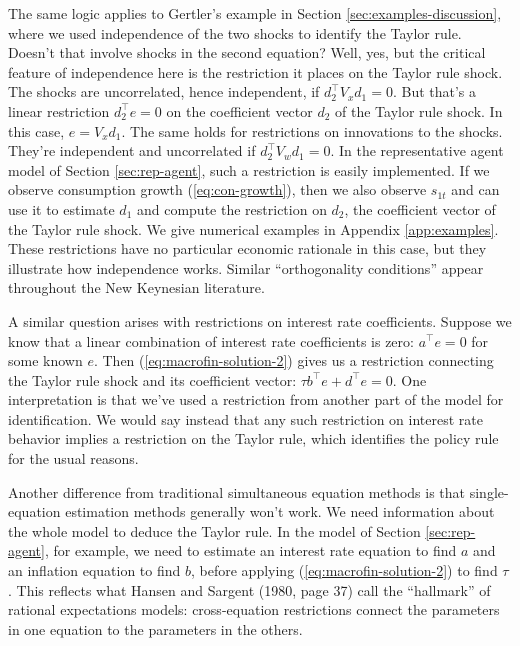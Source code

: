 \documentclass[11pt]{article}
\begin{document}
{The same logic applies to Gertler's example in Section \ref{sec:examples-discussion},
where we used independence of the two shocks to identify the Taylor rule.
Doesn't that involve shocks in the second equation?
Well, yes, but the critical feature of independence here
is the restriction it places on the Taylor rule shock.
The shocks are uncorrelated, hence independent, if $d_2^\top V_x d_1 = 0$.
But that's a linear restriction $d_2^\top e = 0$ on the coefficient vector $d_2$ of the Taylor rule shock.  In this case, $e = V_x d_1$.
The same holds for restrictions on innovations to the shocks.
They're independent and uncorrelated if $d_2^\top V_w d_1 = 0$.
In the representative agent model of Section \ref{sec:rep-agent},
such a restriction is easily implemented.
If we observe consumption growth (\ref{eq:con-growth}),
then we also observe $s_{1t}$ and can use it to estimate $d_1$
and compute the restriction on $d_2$,
the coefficient vector of the Taylor rule shock.
We give numerical examples in Appendix \ref{app:examples}.
These restrictions have no particular economic rationale in this case,
but they illustrate how independence works.
Similar ``orthogonality conditions'' appear throughout the New Keynesian literature.

A similar question arises with restrictions on interest rate coefficients.
Suppose we know that a linear combination of interest rate coefficients is zero:
 $a^\top e = 0$ for some known $e$.
Then (\ref{eq:macrofin-solution-2}) gives us a restriction connecting
the Taylor rule shock and its coefficient vector:
$ \tau b^\top e + d^\top e = 0$.
One interpretation is that we've used a restriction from another part of the model
for identification.
We would say instead that any such restriction on interest rate behavior
implies a restriction on the Taylor rule, which identifies the policy rule for the usual reasons.


Another difference from traditional simultaneous equation methods
is that single-equation estimation methods generally won't work.
We need information about the whole model to deduce the Taylor rule.
In the model of Section \ref{sec:rep-agent}, for example,
we need to estimate an interest rate equation to find $a$ and
an inflation equation to find $b$, before applying (\ref{eq:macrofin-solution-2}) to find $\tau$.
This reflects what Hansen and Sargent (1980, page 37) call the ``hallmark''
of rational expectations models:  cross-equation restrictions
connect the parameters in one equation to the parameters in the others.


}
\end{document}

